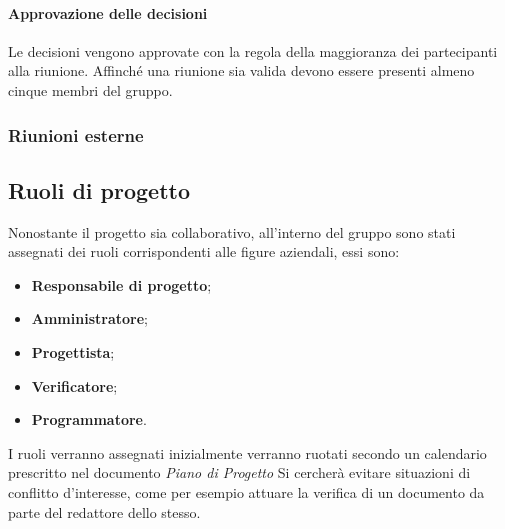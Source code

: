                     \paragraph{Approvazione delle decisioni}
                        Le decisioni vengono approvate con la regola della maggioranza dei partecipanti alla riunione.
                        Affinché una riunione sia valida devono essere presenti almeno cinque membri del gruppo.
                        
                  \subsubsection{Riunioni esterne}
                  
            \subsection{Ruoli di progetto}
                Nonostante il progetto sia collaborativo, all'interno del gruppo sono stati assegnati dei ruoli corrispondenti alle figure aziendali, essi sono:
                \begin{itemize}
                    \item \textbf{Responsabile di progetto};
                    \item \textbf{Amministratore};
                    \item \textbf{Progettista};
                    \item \textbf{Verificatore};
                    \item \textbf{Programmatore}.
                \end{itemize}
                I ruoli verranno assegnati inizialmente verranno ruotati secondo un calendario prescritto nel documento \textit{Piano di Progetto}
                Si cercherà evitare situazioni di conflitto d'interesse, come per esempio attuare la verifica di un documento da parte del redattore dello stesso.
